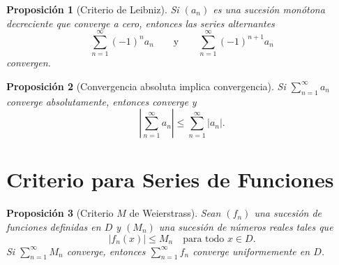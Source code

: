 \documentclass{article}
\newtheorem{proposicion}{Proposición}
\begin{document}
\begin{proposicion}[Criterio de Leibniz]
Si $(a_n)$ es una sucesión monótona decreciente que converge a cero, entonces
las series alternantes
\[
  \sum_{n=1}^{\infty} (-1)^n a_n \qquad \text{y} \qquad \sum_{n=1}^{\infty} (-1)^{n+1} a_n
\]
convergen.
\end{proposicion}

\begin{proposicion}[Convergencia absoluta implica convergencia]
Si $\sum_{n=1}^{\infty} a_n$ converge absolutamente, entonces converge y
\[
  \left|\sum_{n=1}^{\infty} a_n\right| \leq \sum_{n=1}^{\infty} |a_n|.
\]
\end{proposicion}

\section*{Criterio para Series de Funciones}

\begin{proposicion}[Criterio $M$ de Weierstrass]
Sean $(f_n)$ una sucesión de funciones definidas en $D$ y $(M_n)$ una sucesión
de números reales tales que
\[
  |f_n(x)| \leq M_n \quad \text{para todo } x \in D.
\]
Si $\sum_{n=1}^{\infty} M_n$ converge, entonces $\sum_{n=1}^{\infty} f_n$ converge uniformemente en $D$.
\end{proposicion}
\end{document}
